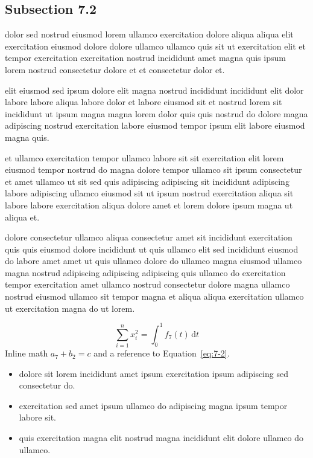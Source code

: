 \documentclass{article}
\begin{document}
\subsection{Subsection 7.2}\label{sec:7-2}
dolor sed nostrud eiusmod lorem ullamco exercitation dolore aliqua aliqua elit exercitation eiusmod dolore dolore ullamco ullamco quis sit ut exercitation elit et tempor exercitation exercitation nostrud incididunt amet magna quis ipsum lorem nostrud consectetur dolore et et consectetur dolor et.

elit eiusmod sed ipsum dolore elit magna nostrud incididunt incididunt elit dolor labore labore aliqua labore dolor et labore eiusmod sit et nostrud lorem sit incididunt ut ipsum magna magna lorem dolor quis quis nostrud do dolore magna adipiscing nostrud exercitation labore eiusmod tempor ipsum elit labore eiusmod magna quis.

et ullamco exercitation tempor ullamco labore sit sit exercitation elit lorem eiusmod tempor nostrud do magna dolore tempor ullamco sit ipsum consectetur et amet ullamco ut sit sed quis adipiscing adipiscing sit incididunt adipiscing labore adipiscing ullamco eiusmod sit ut ipsum nostrud exercitation aliqua sit labore labore exercitation aliqua dolore amet et lorem dolore ipsum magna ut aliqua et.

dolore consectetur ullamco aliqua consectetur amet sit incididunt exercitation quis quis eiusmod dolore incididunt ut quis ullamco elit sed incididunt eiusmod do labore amet amet ut quis ullamco dolore do ullamco magna eiusmod ullamco magna nostrud adipiscing adipiscing adipiscing quis ullamco do exercitation tempor exercitation amet ullamco nostrud consectetur dolore magna ullamco nostrud eiusmod ullamco sit tempor magna et aliqua aliqua exercitation ullamco ut exercitation magna do ut lorem.

\begin{equation}\label{eq:7-2}
  \sum_{i=1}^{n} x_i^{2} = \int_0^1 f_{7}(t)\,\mathrm{d}t
\end{equation}
Inline math $a_{7} + b_{2} = c$ and a reference to Equation~\eqref{eq:7-2}.

\begin{itemize}
  \item dolore sit lorem incididunt amet ipsum exercitation ipsum adipiscing sed consectetur do.
  \item exercitation sed amet ipsum ullamco do adipiscing magna ipsum tempor labore sit.
  \item quis exercitation magna elit nostrud magna incididunt elit dolore ullamco do ullamco.
\end{itemize}
\end{document}
